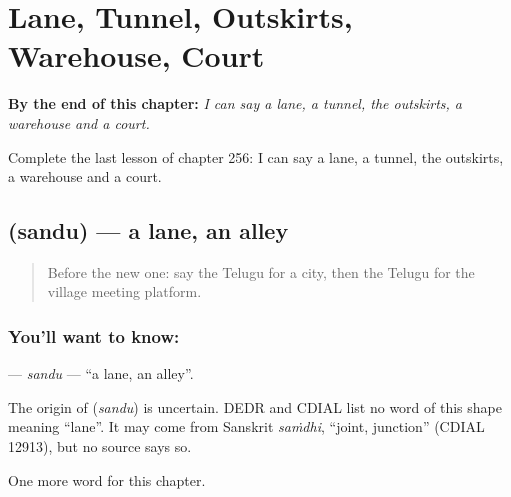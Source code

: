 
\chapter{Lane, Tunnel, Outskirts, Warehouse, Court}
\label{ch:te-lane-tunnel-outskirts-warehouse-court}

\begin{chapteropening}
\textbf{By the end of this chapter:} \emph{I can say a lane, a tunnel, the outskirts, a warehouse and a court.}

Complete the last lesson of chapter 256: I can say a lane, a tunnel, the outskirts, a warehouse and a court.
\end{chapteropening}

\section[\texorpdfstring{\te{సందు} (sandu)}{సందు (sandu)}]{ (sandu) — a lane, an alley}

\label{lesson:TE-C256-sandu}



\begin{quote}
Before the new one: say the Telugu for a city, then the Telugu for the village meeting platform.
\end{quote}

\subsection*{You'll want to know: }
\textbf{} — \emph{sandu} — \textquotedblleft{}a lane, an alley\textquotedblright{}.

\begin{cousinweb}
The origin of \textbf{} (\emph{sandu}) is uncertain. DEDR and CDIAL list no word of this shape meaning \textquotedblleft{}lane\textquotedblright{}. It may come from Sanskrit \emph{saṁdhi}, \textquotedblleft{}joint, junction\textquotedblright{} (CDIAL 12913), but no source says so.
\end{cousinweb}

\begin{grammarlens}[title={What you've built}]
One more word for this chapter.
\end{grammarlens}


